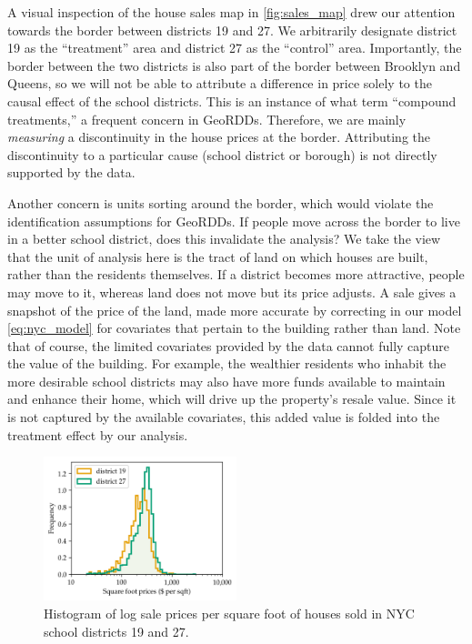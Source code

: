 \documentclass[12pt]{article}
\begin{document}
A visual inspection of the house sales map in \autoref{fig:sales_map} drew our attention towards the border between districts 19 and 27.
We arbitrarily designate district 19 as the ``treatment'' area and district 27 as the ``control'' area.
Importantly, the border between the two districts is also part of the border between Brooklyn and Queens, so we will not be able to attribute a difference in price solely to the causal effect of the school districts.
This is an instance of what \cite{keele_titiunik_2015} term ``compound treatments,'' a frequent concern in GeoRDDs.
Therefore, we are mainly \emph{measuring} a discontinuity in the house prices at the border.
Attributing the discontinuity to a particular cause (school district or borough) is not directly supported by the data.

Another concern is units sorting around the border, which would violate the identification assumptions for GeoRDDs.
If people move across the border to live in a better school district, does this invalidate the analysis?
We take the view that the unit of analysis here is the tract of land on which houses are built, rather than the residents themselves.
If a district becomes more attractive, people may move to it, whereas land does not move but its price adjusts.
A sale gives a snapshot of the price of the land, made more accurate by correcting in our model \autoref{eq:nyc_model} for covariates that pertain to the building rather than land.
Note that of course, the limited covariates provided by the data cannot fully capture the value of the building.
For example, the wealthier residents who inhabit the more desirable school districts may also have more funds available to maintain and enhance their home, which will drive up the property's resale value.
Since it is not captured by the available covariates, this added value is folded into the treatment effect by our analysis.

\begin{figure}[tb]
    \centering
    \includegraphics[width=0.5\textwidth]{../NYC/NYC_plots/sales_histogram_19-27.png}
    \caption{\label{fig:NYC_histogram}Histogram of log sale prices per square foot of houses sold in NYC school districts 19 and 27.}
\end{figure}
\end{document}
